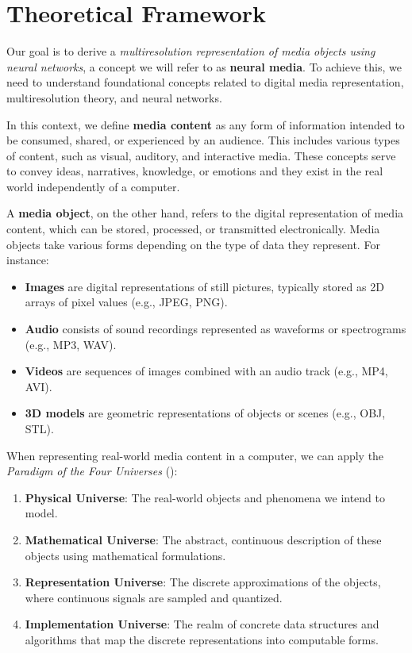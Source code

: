 \chapter{Theoretical Framework}

Our goal is to derive a \textit{multiresolution representation of media objects using neural networks}, a concept we will refer to as \textbf{neural media}. To achieve this, we need to understand foundational concepts related to digital media representation, multiresolution theory, and neural networks.

In this context, we define \textbf{media content} as any form of information intended to be consumed, shared, or experienced by an audience. This includes various types of content, such as visual, auditory, and interactive media. These concepts serve to convey ideas, narratives, knowledge, or emotions and they exist in the real world independently of a computer.

A \textbf{media object}, on the other hand, refers to the digital representation of media content, which can be stored, processed, or transmitted electronically. Media objects take various forms depending on the type of data they represent. For instance:

\begin{itemize}
\item \textbf{Images} are digital representations of still pictures, typically stored as 2D arrays of pixel values (e.g., JPEG, PNG).
\item \textbf{Audio} consists of sound recordings represented as waveforms or spectrograms (e.g., MP3, WAV).
\item \textbf{Videos} are sequences of images combined with an audio track (e.g., MP4, AVI).
\item \textbf{3D models} are geometric representations of objects or scenes (e.g., OBJ, STL).
\end{itemize}

When representing real-world media content in a computer, we can apply the \textit{Paradigm of the Four Universes} (\cite{gomes1995}):

\begin{enumerate}
\item \textbf{Physical Universe}: The real-world objects and phenomena we intend to model.
\item \textbf{Mathematical Universe}: The abstract, continuous description of these objects using mathematical formulations.
\item \textbf{Representation Universe}: The discrete approximations of the objects, where continuous signals are sampled and quantized.
\item \textbf{Implementation Universe}: The realm of concrete data structures and algorithms that map the discrete representations into computable forms.
\end{enumerate}


